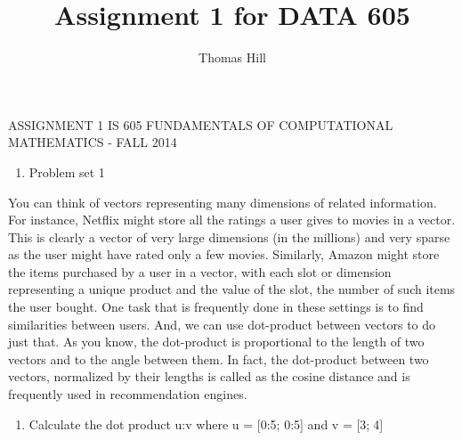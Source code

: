 \documentclass[
]{article}
\title{Assignment 1 for DATA 605}
\author{Thomas Hill}
\date{}
\providecommand{\tightlist}{%
  \setlength{\itemsep}{0pt}\setlength{\parskip}{0pt}}
\begin{document}
\maketitle

ASSIGNMENT 1 IS 605 FUNDAMENTALS OF COMPUTATIONAL MATHEMATICS - FALL
2014

\begin{enumerate}
\def\labelenumi{\arabic{enumi}.}
\tightlist
\item
  Problem set 1
\end{enumerate}

You can think of vectors representing many dimensions of related
information. For instance, Netflix might store all the ratings a user
gives to movies in a vector. This is clearly a vector of very large
dimensions (in the millions) and very sparse as the user might have
rated only a few movies. Similarly, Amazon might store the items
purchased by a user in a vector, with each slot or dimension
representing a unique product and the value of the slot, the number of
such items the user bought. One task that is frequently done in these
settings is to find similarities between users. And, we can use
dot-product between vectors to do just that. As you know, the
dot-product is proportional to the length of two vectors and to the
angle between them. In fact, the dot-product between two vectors,
normalized by their lengths is called as the cosine distance and is
frequently used in recommendation engines.

\begin{enumerate}
\def\labelenumi{(\arabic{enumi})}
\tightlist
\item
  Calculate the dot product u:v where u = {[}0:5; 0:5{]} and v =
  {[}3;􀀀4{]}
\end{enumerate}
\end{document}
